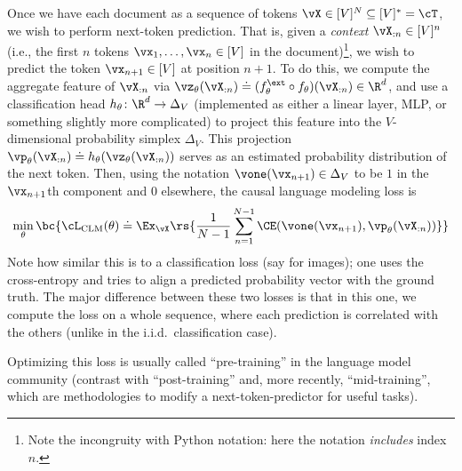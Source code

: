 \documentclass[../../book-main.tex]{subfiles}
\begin{document}
Once we have each document as a sequence of tokens \(\vX \in [V]^{N}
\subseteq [V]^{*} = \cT\), we wish to perform next-token prediction.
That is, given a \textit{context} \(\vX_{:n} \in [V]^{n}\) (i.e., the
first \(n\) tokens \(\vx_{1}, \dots, \vx_{n} \in [V]\) in the
document)\footnote{Note the incongruity with Python notation: here
the notation \textit{includes} index \(n\).}, we wish to predict the
token \(\vx_{n + 1} \in [V]\) at position \(n + 1\). To do this, we
compute the aggregate feature of \(\vX_{:n}\) via
\(\vz_{\theta}(\vX_{:n}) \doteq (f_{\theta}^{\ext} \circ
f_{\theta})(\vX_{:n}) \in \R^{d}\), and use a classification head
\(h_{\theta} \colon \R^{d} \to \Delta_{V}\) (implemented as either a
linear layer, MLP, or something slightly more complicated) to project
this feature into the \(V\)-dimensional probability simplex
\(\Delta_{V}\). This projection \(\vp_{\theta}(\vX_{:n}) \doteq
h_{\theta}(\vz_{\theta}(\vX_{:n}))\) serves as an estimated
probability distribution of the next token. Then, using the notation
\(\vone(\vx_{n + 1}) \in \Delta_{V}\) to be \(1\) in the \(\vx_{n +
1}\)th component and \(0\) elsewhere, the causal language modeling loss is
\begin{equation}\label{eq:clm_loss}
\min_{\theta}\bc{\cL_{\mathrm{CLM}}(\theta) \doteq
\Ex_{\vX}\rs{\frac{1}{N - 1}\sum_{n = 1}^{N - 1}\CE(\vone(\vx_{n +
1}), \vp_{\theta}(\vX_{:n}))}}
\end{equation}
Note how similar this is to a classification loss (say for images);
one uses the cross-entropy and tries to align a predicted probability
vector with the ground truth. The major difference between these two
losses is that in this one, we compute the loss on a whole sequence,
where each prediction is correlated with the others (unlike in the
i.i.d.~classification case).

Optimizing this loss is usually called ``pre-training'' in the
language model community (contrast with ``post-training'' and, more
recently, ``mid-training'', which are methodologies to modify a
next-token-predictor for useful tasks).
\end{document}
